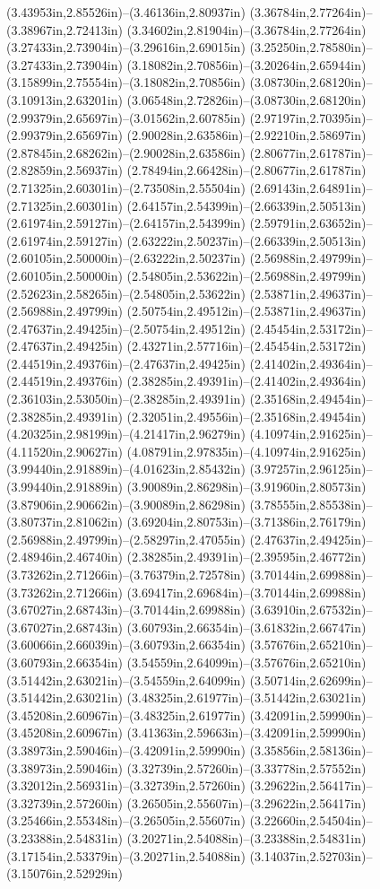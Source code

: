 (3.43953in,2.85526in)--(3.46136in,2.80937in) (3.36784in,2.77264in)--(3.38967in,2.72413in) (3.34602in,2.81904in)--(3.36784in,2.77264in) (3.27433in,2.73904in)--(3.29616in,2.69015in) (3.25250in,2.78580in)--(3.27433in,2.73904in) (3.18082in,2.70856in)--(3.20264in,2.65944in) (3.15899in,2.75554in)--(3.18082in,2.70856in) (3.08730in,2.68120in)--(3.10913in,2.63201in) (3.06548in,2.72826in)--(3.08730in,2.68120in) (2.99379in,2.65697in)--(3.01562in,2.60785in) (2.97197in,2.70395in)--(2.99379in,2.65697in) (2.90028in,2.63586in)--(2.92210in,2.58697in) (2.87845in,2.68262in)--(2.90028in,2.63586in) (2.80677in,2.61787in)--(2.82859in,2.56937in) (2.78494in,2.66428in)--(2.80677in,2.61787in) (2.71325in,2.60301in)--(2.73508in,2.55504in) (2.69143in,2.64891in)--(2.71325in,2.60301in) (2.64157in,2.54399in)--(2.66339in,2.50513in) (2.61974in,2.59127in)--(2.64157in,2.54399in) (2.59791in,2.63652in)--(2.61974in,2.59127in) (2.63222in,2.50237in)--(2.66339in,2.50513in) (2.60105in,2.50000in)--(2.63222in,2.50237in) (2.56988in,2.49799in)--(2.60105in,2.50000in) (2.54805in,2.53622in)--(2.56988in,2.49799in) (2.52623in,2.58265in)--(2.54805in,2.53622in) (2.53871in,2.49637in)--(2.56988in,2.49799in) (2.50754in,2.49512in)--(2.53871in,2.49637in) (2.47637in,2.49425in)--(2.50754in,2.49512in) (2.45454in,2.53172in)--(2.47637in,2.49425in) (2.43271in,2.57716in)--(2.45454in,2.53172in) (2.44519in,2.49376in)--(2.47637in,2.49425in) (2.41402in,2.49364in)--(2.44519in,2.49376in) (2.38285in,2.49391in)--(2.41402in,2.49364in) (2.36103in,2.53050in)--(2.38285in,2.49391in) (2.35168in,2.49454in)--(2.38285in,2.49391in) (2.32051in,2.49556in)--(2.35168in,2.49454in) (4.20325in,2.98199in)--(4.21417in,2.96279in) (4.10974in,2.91625in)--(4.11520in,2.90627in) (4.08791in,2.97835in)--(4.10974in,2.91625in) (3.99440in,2.91889in)--(4.01623in,2.85432in) (3.97257in,2.96125in)--(3.99440in,2.91889in) (3.90089in,2.86298in)--(3.91960in,2.80573in) (3.87906in,2.90662in)--(3.90089in,2.86298in) (3.78555in,2.85538in)--(3.80737in,2.81062in) (3.69204in,2.80753in)--(3.71386in,2.76179in) (2.56988in,2.49799in)--(2.58297in,2.47055in) (2.47637in,2.49425in)--(2.48946in,2.46740in) (2.38285in,2.49391in)--(2.39595in,2.46772in) (3.73262in,2.71266in)--(3.76379in,2.72578in) (3.70144in,2.69988in)--(3.73262in,2.71266in) (3.69417in,2.69684in)--(3.70144in,2.69988in) (3.67027in,2.68743in)--(3.70144in,2.69988in) (3.63910in,2.67532in)--(3.67027in,2.68743in) (3.60793in,2.66354in)--(3.61832in,2.66747in) (3.60066in,2.66039in)--(3.60793in,2.66354in) (3.57676in,2.65210in)--(3.60793in,2.66354in) (3.54559in,2.64099in)--(3.57676in,2.65210in) (3.51442in,2.63021in)--(3.54559in,2.64099in) (3.50714in,2.62699in)--(3.51442in,2.63021in) (3.48325in,2.61977in)--(3.51442in,2.63021in) (3.45208in,2.60967in)--(3.48325in,2.61977in) (3.42091in,2.59990in)--(3.45208in,2.60967in) (3.41363in,2.59663in)--(3.42091in,2.59990in) (3.38973in,2.59046in)--(3.42091in,2.59990in) (3.35856in,2.58136in)--(3.38973in,2.59046in) (3.32739in,2.57260in)--(3.33778in,2.57552in) (3.32012in,2.56931in)--(3.32739in,2.57260in) (3.29622in,2.56417in)--(3.32739in,2.57260in) (3.26505in,2.55607in)--(3.29622in,2.56417in) (3.25466in,2.55348in)--(3.26505in,2.55607in) (3.22660in,2.54504in)--(3.23388in,2.54831in) (3.20271in,2.54088in)--(3.23388in,2.54831in) (3.17154in,2.53379in)--(3.20271in,2.54088in) (3.14037in,2.52703in)--(3.15076in,2.52929in) 